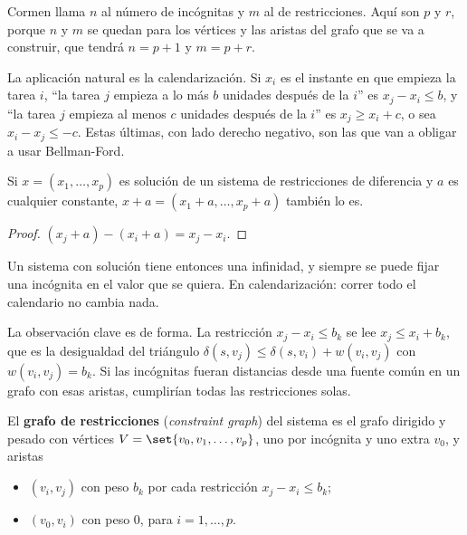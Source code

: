 \documentclass[11pt,letterpaper]{article}
\begin{document}
Cormen llama $n$ al número de incógnitas y $m$ al de restricciones.
Aquí son $p$ y $r$, porque $n$ y $m$ se quedan para los vértices y las
aristas del grafo que se va a construir, que tendrá $n = p + 1$ y
$m = p + r$.

La aplicación natural es la calendarización. Si $x_i$ es el instante
en que empieza la tarea $i$, ``la tarea $j$ empieza a lo más $b$
unidades después de la $i$'' es $x_j - x_i \le b$, y ``la tarea $j$
empieza al menos $c$ unidades después de la $i$'' es
$x_j \ge x_i + c$, o sea $x_i - x_j \le -c$. Estas últimas, con lado
derecho negativo, son las que van a obligar a usar Bellman-Ford.

\begin{lema}
  \label{lem:traslacion-restricciones}
  Si $x = (x_1, \dots, x_p)$ es solución de un sistema de
  restricciones de diferencia y $a$ es cualquier constante,
  $x + a = (x_1 + a, \dots, x_p + a)$ también lo es.
\end{lema}

\begin{proof}
  $(x_j + a) - (x_i + a) = x_j - x_i$.
\end{proof}

Un sistema con solución tiene entonces una infinidad, y siempre se
puede fijar una incógnita en el valor que se quiera. En
calendarización: correr todo el calendario no cambia nada.

La observación clave es de forma. La restricción $x_j - x_i \le b_k$
se lee $x_j \le x_i + b_k$, que es la desigualdad del triángulo
$\delta(s, v_j) \le \delta(s, v_i) + w(v_i, v_j)$ con
$w(v_i, v_j) = b_k$. Si las incógnitas fueran distancias desde una
fuente común en un grafo con esas aristas, cumplirían todas las
restricciones solas.

\begin{definicion}
  \label{def:grafo-restricciones}
  El \textbf{grafo de restricciones} (\textit{constraint graph}) del
  sistema es el grafo dirigido y pesado con vértices
  $V = \set{v_0, v_1, \dots, v_p}$, uno por incógnita y uno extra
  $v_0$, y aristas
  \begin{itemize}[itemsep=0.1em]
    \item $(v_i, v_j)$ con peso $b_k$ por cada restricción
          $x_j - x_i \le b_k$;
    \item $(v_0, v_i)$ con peso $0$, para $i = 1, \dots, p$.
  \end{itemize}
\end{definicion}
\end{document}
